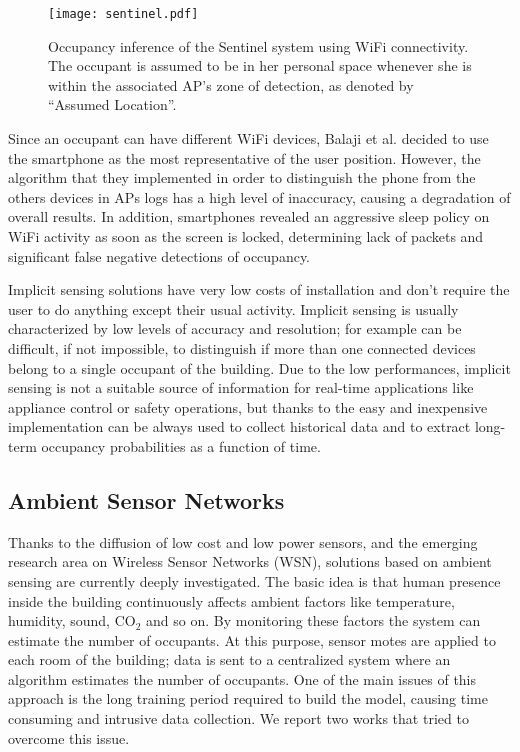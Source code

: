 \begin{figure}[h!tb]
\centering
\texttt{[image: sentinel.pdf]}
\caption[Occupancy inference of the Sentinel system using WiFi connectivity]{Occupancy inference of the Sentinel system using WiFi connectivity. The occupant is assumed to be in her personal space whenever she is within the associated AP’s zone of detection, as denoted by “Assumed Location”.}
\label{fig:sentinel}
\end{figure}

Since an occupant can have different WiFi devices, Balaji et al. decided to use the smartphone as the most representative of the user position. However, the algorithm that they implemented in order to distinguish the phone from the others devices in APs logs has a high level of inaccuracy, causing a degradation of overall results. In addition, smartphones revealed an aggressive sleep policy on WiFi activity as soon as the screen is locked, determining lack of packets and significant false negative detections of occupancy.

\medskip
Implicit sensing solutions have very low costs of installation and don't require the user to do anything except their usual activity. Implicit sensing is usually characterized by low levels of accuracy and resolution; for example can be difficult, if not impossible, to distinguish if more than one connected devices belong to a single occupant of the building. Due to the low performances, implicit sensing is not a suitable source of information for real-time applications like appliance control or safety operations, but thanks to the easy and inexpensive implementation can be always used to collect historical data and to extract long-term occupancy probabilities as a function of time.

\subsection{Ambient Sensor Networks}
\label{subsec:ambient}
Thanks to the diffusion of low cost and low power sensors, and the emerging research area on Wireless Sensor Networks (WSN), solutions based on ambient sensing are currently deeply investigated.
The basic idea is that human presence inside the building continuously affects ambient factors like temperature, humidity, sound, CO\(_2\) and so on. By monitoring these factors the system can estimate the number of occupants.
At this purpose, sensor motes are applied to each room of the building; data is sent to a centralized system where an algorithm estimates the number of occupants. One of the main issues of this approach is the long training period required to build the model, causing time consuming and intrusive data collection. We report two works that tried to overcome this issue.

